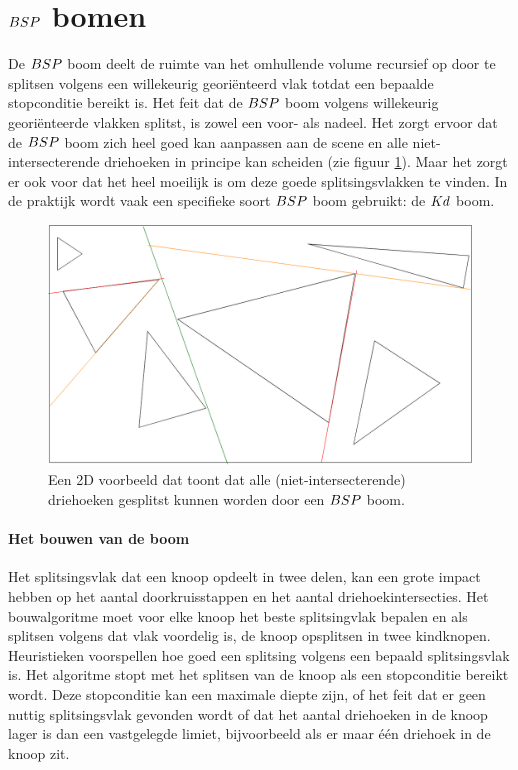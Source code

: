 \section{$BSP$ bomen}
    De $BSP$ boom deelt de ruimte van het omhullende volume recursief op door te splitsen volgens een willekeurig georiënteerd vlak totdat een bepaalde stopconditie bereikt is.
    Het feit dat de $BSP$ boom volgens willekeurig georiënteerde vlakken splitst, is zowel een voor- als nadeel.
    Het zorgt ervoor dat de $BSP$ boom zich heel goed kan aanpassen aan de scene en alle niet-intersecterende driehoeken in principe kan scheiden (zie figuur \ref{fig:splitsing-bsp}).
    Maar het zorgt er ook voor dat het heel moeilijk is om deze goede splitsingsvlakken te vinden.
    In de praktijk wordt vaak een specifieke soort $BSP$ boom gebruikt: de $Kd$ boom.
    \begin{figure}
        \centering
        \includegraphics[width=\linewidth]{img/splitsing-BSP}
        \caption{Een 2D voorbeeld dat toont dat alle (niet-intersecterende) driehoeken gesplitst kunnen worden door een $BSP$ boom.}
        \label{fig:splitsing-bsp}    
    \end{figure}    
    \paragraph{Het bouwen van de boom}
    Het splitsingsvlak dat een knoop opdeelt in twee delen, kan een grote impact hebben op het aantal doorkruisstappen en het aantal driehoekintersecties.
    Het bouwalgoritme moet voor elke knoop het beste splitsingvlak bepalen en als splitsen volgens dat vlak voordelig is, de knoop opsplitsen in twee kindknopen.
    Heuristieken voorspellen hoe goed een splitsing volgens een bepaald splitsingsvlak is.   
    Het algoritme stopt met het splitsen van de knoop als een stopconditie bereikt wordt.
    Deze stopconditie kan een maximale diepte zijn, of het feit dat er geen nuttig splitsingsvlak gevonden wordt of dat het aantal driehoeken in de knoop lager is dan een vastgelegde limiet, bijvoorbeeld als er maar één driehoek in de knoop zit.

